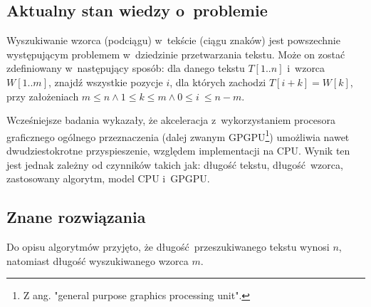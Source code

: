 \subsection{Aktualny stan wiedzy o~problemie}
Wyszukiwanie wzorca (podciągu) w~tekście (ciągu znaków) jest powszechnie występującym problemem w~dziedzinie przetwarzania tekstu. Może on zostać zdefiniowany w~następujący sposób: dla danego tekstu $ T[1..n]$ i~wzorca $ W[1..m] $, znajdź wszystkie pozycje $i$, dla których zachodzi $ T[i+k] = W[k] $, przy założeniach $ m \leq n \wedge 1 \leq k \leq m \wedge 0 \leq i~\leq n - m$.

Wcześniejsze badania wykazały, że akceleracja z~wykorzystaniem procesora graficznego ogólnego przeznaczenia (dalej zwanym GPGPU\footnote{Z ang. "general purpose graphics processing unit".}) umożliwia nawet dwudziestokrotne przyspieszenie, względem implementacji na CPU\cite{StringMatchingMulticoreGPU}. Wynik ten jest jednak zależny od czynników takich jak: długość tekstu, długość wzorca, zastosowany algorytm, model CPU i~GPGPU.

\subsection{Znane rozwiązania}
Do opisu algorytmów przyjęto, że długość przeszukiwanego tekstu wynosi $n$, natomiast długość wyszukiwanego wzorca $m$.

